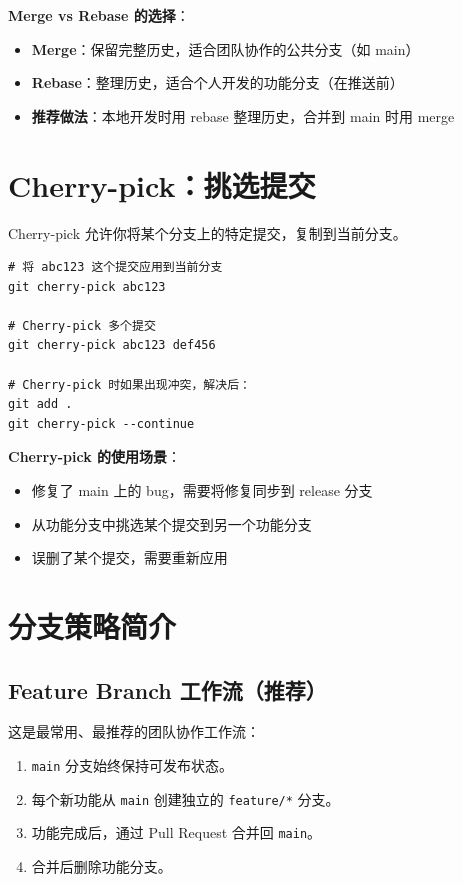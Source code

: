 \documentclass[12pt,a4paper,openany]{ctexbook}
\begin{document}
\medskip
\textbf{Merge vs Rebase 的选择}：
\begin{itemize}
  \item \textbf{Merge}：保留完整历史，适合团队协作的公共分支（如 main）
  \item \textbf{Rebase}：整理历史，适合个人开发的功能分支（在推送前）
  \item \textbf{推荐做法}：本地开发时用 rebase 整理历史，合并到 main 时用 merge
\end{itemize}
\medskip

\section{Cherry-pick：挑选提交}

Cherry-pick 允许你将某个分支上的特定提交，复制到当前分支。

\begin{lstlisting}[style=shell]
# 将 abc123 这个提交应用到当前分支
git cherry-pick abc123

# Cherry-pick 多个提交
git cherry-pick abc123 def456

# Cherry-pick 时如果出现冲突，解决后：
git add .
git cherry-pick --continue
\end{lstlisting}

\medskip
\textbf{Cherry-pick 的使用场景}：
\begin{itemize}
  \item 修复了 main 上的 bug，需要将修复同步到 release 分支
  \item 从功能分支中挑选某个提交到另一个功能分支
  \item 误删了某个提交，需要重新应用
\end{itemize}
\medskip

\section{分支策略简介}

\subsection{Feature Branch 工作流（推荐）}

这是最常用、最推荐的团队协作工作流：

\begin{enumerate}[leftmargin=2em]
  \item \texttt{main} 分支始终保持可发布状态。
  \item 每个新功能从 \texttt{main} 创建独立的 \texttt{feature/*} 分支。
  \item 功能完成后，通过 Pull Request 合并回 \texttt{main}。
  \item 合并后删除功能分支。
\end{enumerate}
\end{document}
